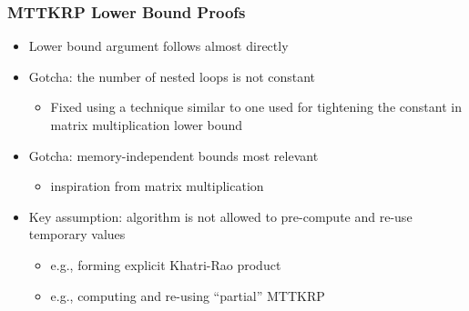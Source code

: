 \documentclass[xcolor=dvipsnames]{beamer}
\begin{document}
\begin{frame}
\frametitle{MTTKRP Lower Bound Proofs}

\begin{itemize}
	\item Lower bound argument follows \cite{CDKSY13} almost directly
	\vfill
	\pause
	\item Gotcha: the number of nested loops is not constant
	\begin{itemize}
		\item Fixed using a technique similar to one used for tightening the constant in matrix multiplication lower bound \cite{SvdG17}
	\end{itemize}
	\vfill
	\pause
	\item Gotcha: memory-independent bounds most relevant
	\begin{itemize}
		\item inspiration from matrix multiplication \cite{BDHLS12-SS,DE+13}
	\end{itemize}
	\vfill
	\pause
	\item Key assumption: algorithm is not allowed to pre-compute and re-use temporary values 
	\begin{itemize}
		\item e.g., forming explicit Khatri-Rao product
		\item e.g., computing and re-using ``partial'' MTTKRP
	\end{itemize}
\end{itemize}

\end{frame}
\end{document}
